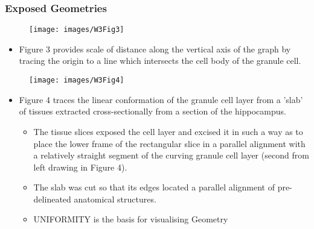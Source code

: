 \documentclass[a4paper]{article}
\begin{document}
\subsubsection{Exposed Geometries}
\begin{figure}[H]
	\centering
	\texttt{[image: images/W3Fig3]}
	\label{fig:w3fig3}
\end{figure}
\begin{itemize}
	\item Figure 3 provides scale of distance along the vertical axis of the graph by tracing the origin to a line which intersects the cell body of the granule cell.
\end{itemize}
\begin{figure}[H]
	\centering
	\texttt{[image: images/W3Fig4]}
	\label{fig:w3fig4}
\end{figure}
\begin{itemize}
	\item Figure 4 traces the linear conformation of the granule cell layer from a 'slab' of tissues extracted cross-sectionally from a section of the hippocampus.
	\begin{itemize}[label=$\circ$]
		\item The tissue slices exposed the cell layer and excised it in such a way as to place the lower frame of the rectangular slice in a parallel alignment with a relatively straight segment of the curving granule cell layer (second from left drawing in Figure 4). 
		\item The slab was cut so that its edges located a parallel alignment of pre-delineated anatomical structures.
		\item UNIFORMITY is the basis for visualising Geometry
	\end{itemize}
\end{itemize}
\end{document}
